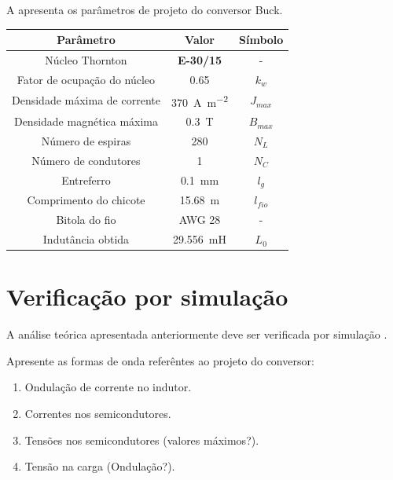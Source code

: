 A  apresenta os parâmetros de projeto do conversor Buck.
\begin{table}[!ht]
	\centering
	\label{tab:IndutorBuck}
	\begin{tabular}{@{}ccc@{}}
		\toprule
		\textbf{Parâmetro} & \textbf{Valor} & \textbf{Símbolo} \\ \midrule	
			Núcleo  Thornton      & \textbf{E-30/15}    & -  \\				
		Fator de ocupação do núcleo & \SI{0.65}{}     & $k_w$  \\
		Densidade máxima de corrente & \SI{370}{\ampere\per\square\meter}     & $J_{max}$  \\
		Densidade magnética máxima & \SI{0.3}{\tesla}     & $B_{max}$  \\			
		Número de espiras        & \SI{280}{}     & $N_L$  \\	
		Número de condutores        & \SI{1}{}     & $N_C$  \\		
		Entreferro         &  \SI{0.1}{\mm}      & $l_g$  \\
		Comprimento do chicote        &  \SI{15.68}{\m}      & $l_{fio}$  \\
		Bitola do fio        &  AWG 28     & -  \\
		Indutância obtida         & \SI{29.556}{\milli\henry}     & $L_0$  \\ \bottomrule	
	\end{tabular}
\end{table}



\section{Verificação por simulação}

A análise teórica apresentada anteriormente deve ser verificada por simulação \cite{noauthor_psim_nodate}.
									
 Apresente as formas de onda referêntes ao projeto do conversor:
 
\begin{enumerate}
	\item Ondulação de corrente no indutor.
	\item Correntes nos semicondutores.
	\item Tensões nos semicondutores (valores máximos?).
	\item Tensão na carga (Ondulação?).
\end{enumerate}


